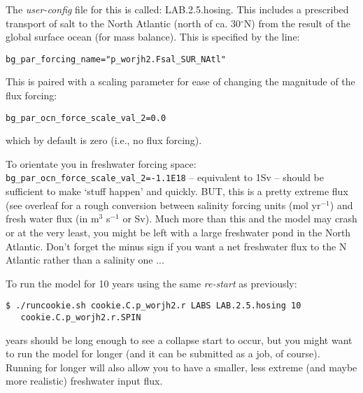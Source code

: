 The \textit{user-config} file for this is called: \textsf{\footnotesize LAB.2.5.hosing}. This includes a prescribed transport of salt to the North Atlantic (north of ca. 30$^{\circ}$N) from the result of the global surface ocean (for mass balance). This is specified by the line:

\vspace{-2mm}\small\begin{verbatim}
bg_par_forcing_name="p_worjh2.Fsal_SUR_NAtl"
\end{verbatim}\normalsize\vspace{-2mm}

This is paired with a scaling parameter for ease of changing the magnitude of the flux forcing:

\vspace{-2mm}\small\begin{verbatim}
bg_par_ocn_force_scale_val_2=0.0
\end{verbatim}\normalsize\vspace{-2mm}

\noindent which by default is zero (i.e., no flux forcing).

\vspace{1mm}
To orientate you in freshwater forcing space: \texttt{\small bg\_par\_ocn\_force\_scale\_val\_2=-1.1E18} -- equivalent to 1Sv -- should be sufficient to make ‘stuff happen’ and quickly. BUT, this is a pretty extreme flux (see overleaf for a rough conversion between salinity forcing units (mol yr$^{-1}$) and fresh water flux (in m$^{3}$ s$^{-1}$ or Sv). Much more than this and the model may crash or at the very least, you might be left with a large freshwater pond in the North Atlantic. Don't forget the minus sign if you want a net freshwater flux to the N Atlantic rather than a salinity one ...

\vspace{1mm}
To run the model for 10 years using the same \textit{re-start} as previously:

\vspace{-2mm}\small\begin{verbatim}
$ ./runcookie.sh cookie.C.p_worjh2.r LABS LAB.2.5.hosing 10 
   cookie.C.p_worjh2.r.SPIN
\end{verbatim}\normalsize\vspace{-2mm}

 years should be long enough to see a collapse start to occur, but you might want to run the model for longer (and it can be submitted as a job, of course). Running for longer will also allow you to have a smaller, less extreme (and maybe more realistic) freshwater input flux.

